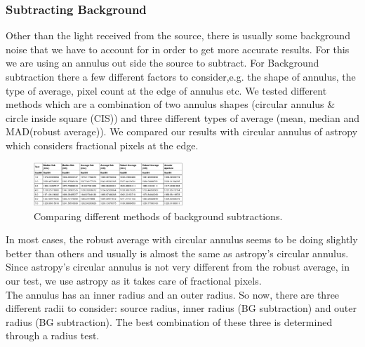 \documentclass[conference]{IEEEtran}
\begin{document}
        
        \subsubsection{Subtracting Background}
        Other than the light received from the source, there is usually some background noise that we have to account for in order to get more accurate results. For this we are using an annulus out side the source to subtract. For Background subtraction there a few different factors to consider,e.g. the shape of annulus, the type of average, pixel count at the edge of annulus etc. We tested different methods which are a combination of two annulus shapes (circular annulus \& circle inside square (CIS)) and three different types of average (mean, median and MAD(robust average)). We compared our results with circular annulus of astropy which considers fractional pixels at the edge.
        
        \begin{figure}[H]
            \includegraphics[width = 0.5\textwidth]{Bg}
            \caption{Comparing different methods of background subtractions.}
        \end{figure}
        
        In most cases, the robust average with circular annulus seems to be doing slightly better than others and usually is almost the same as astropy's circular annulus. Since astropy's circular annulus is not very different from the robust average, in our test, we use astropy as it takes care of fractional pixels.\\
        
        The annulus has an inner radius and an outer radius. So now, there are three different radii to consider: source radius, inner radius (BG subtraction) and outer radius (BG subtraction). The best combination of these three is determined through a radius test. 
        
\end{document}
